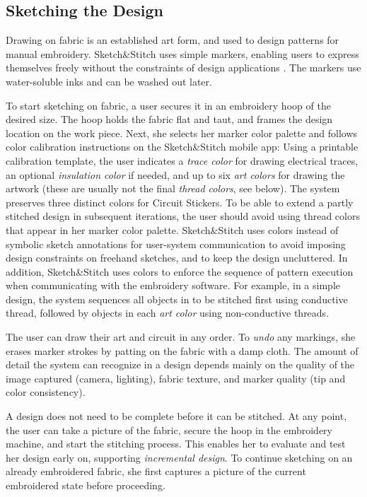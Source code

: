 \documentclass{sigchi}
\begin{document}
\subsection{Sketching the Design}
Drawing on fabric is an established art form, and used to design patterns for manual embroidery. 
Sketch\&Stitch uses simple markers, enabling users to express themselves freely without the constraints of design applications \cite{landay1995interactive,schweikardt2000digital}. The markers use water-soluble inks and can be washed out later.

To start sketching on fabric, a user secures it in an embroidery hoop of the desired size. The hoop holds the fabric flat and taut, and frames the design location on the work piece. Next, she selects her marker color palette and follows color calibration instructions on the Sketch\&Stitch mobile app: Using a printable calibration template, the user indicates a \textit{trace color} for drawing electrical traces, an optional \textit{insulation color} if needed, and up to six \textit{art colors} for drawing the artwork (these are usually not the final \emph{thread colors}, see below).
The system preserves three distinct colors for Circuit Stickers. To be able to extend a partly stitched design in subsequent iterations, the user should avoid using thread colors that appear in her marker color palette. Sketch\&Stitch uses colors instead of symbolic sketch annotations for user-system communication to avoid imposing design constraints on freehand sketches, and to keep the design uncluttered. In addition, Sketch\&Stitch uses colors to enforce the sequence of pattern execution when communicating with the embroidery software. For example, in a simple design, the system sequences all objects in  to be stitched first using conductive thread, followed by objects in each \textit{art color} using non-conductive threads.


 
The user can draw their art and circuit in any order.
To \textit{undo} any markings, she erases marker strokes by patting on the fabric with a damp cloth. The amount of detail the system can recognize in a design depends mainly on the quality of the image captured (camera, lighting), fabric texture, and marker quality (tip and color consistency). 

A design does not need to be complete before it can be stitched. At any point, the user can take a picture of the fabric, secure the hoop in the embroidery machine, and start the stitching process. This enables her to evaluate and test her design early on, supporting \textit{incremental design}. To continue sketching on an already embroidered fabric, she first captures a picture of the current embroidered state before proceeding.
\end{document}
